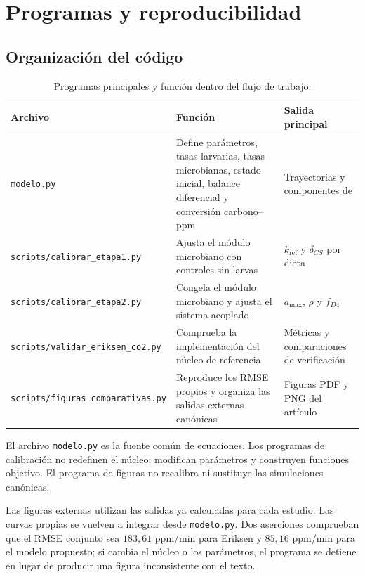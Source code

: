 \section{Programas y reproducibilidad}

\subsection{Organización del código}

\begin{table}[H]
\centering
\small
\caption{Programas principales y función dentro del flujo de trabajo.}
\begin{tabularx}{\textwidth}{l X X}
\toprule
Archivo & Función & Salida principal \\
\midrule
\texttt{modelo.py} &
Define parámetros, tasas larvarias, tasas microbianas, estado inicial,
balance diferencial y conversión carbono--ppm &
Trayectorias y componentes de \co{} \\
\texttt{scripts/calibrar\_etapa1.py} &
Ajusta el módulo microbiano con controles sin larvas &
$k_{\mathrm{ref}}$ y $\delta_{CS}$ por dieta \\
\texttt{scripts/calibrar\_etapa2.py} &
Congela el módulo microbiano y ajusta el sistema acoplado &
$a_{\max}$, $\rho$ y $f_{D4}$ \\
\texttt{scripts/validar\_eriksen\_co2.py} &
Comprueba la implementación del núcleo de referencia &
Métricas y comparaciones de verificación \\
\texttt{scripts/figuras\_comparativas.py} &
Reproduce los RMSE propios y organiza las salidas externas canónicas &
Figuras PDF y PNG del artículo \\
\bottomrule
\end{tabularx}
\end{table}

El archivo \texttt{modelo.py} es la fuente común de ecuaciones. Los
programas de calibración no redefinen el núcleo: modifican parámetros y
construyen funciones objetivo. El programa de figuras no recalibra ni
sustituye las simulaciones canónicas.

Las figuras externas utilizan las salidas ya calculadas para cada
estudio. Las curvas propias se vuelven a integrar desde
\texttt{modelo.py}. Dos aserciones comprueban que el RMSE conjunto sea
$183{,}61$ ppm/min para Eriksen y $85{,}16$ ppm/min para el modelo
propuesto; si cambia el núcleo o los parámetros, el programa se detiene
en lugar de producir una figura inconsistente con el texto.

